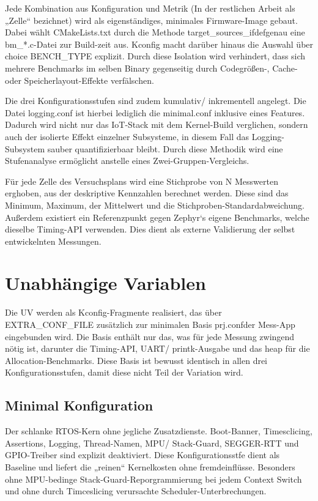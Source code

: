 Jede Kombination aus Konfiguration und Metrik (In der restlichen Arbeit als „Zelle“ bezichnet) wird als eigenständiges, minimales Firmware-Image gebaut. Dabei wählt CMakeLists.txt durch die Methode target\_sources\_ifdefgenau eine bm\_*.c-Datei zur Build-zeit aus. Kconfig macht darüber hinaus die Auswahl über choice BENCH\_TYPE explizit. Durch diese Isolation wird verhindert, dass sich mehrere Benchmarks im selben Binary gegenseitig durch Codegrößen-, Cache- oder Speicherlayout-Effekte verfälschen.

Die drei Konfigurationsstufen sind zudem kumulativ/ inkrementell angelegt. Die Datei logging.conf ist hierbei lediglich die minimal.conf inklusive eines Features. Dadurch wird nicht nur das IoT-Stack mit dem Kernel-Build verglichen, sondern auch der isolierte Effekt einzelner Subsysteme, in diesem Fall das Logging-Subsystem sauber quantifizierbaar bleibt. Durch diese Methodik wird eine Stufenanalyse ermöglicht anstelle eines Zwei-Gruppen-Vergleichs.

Für jede Zelle des Versuchsplans wird eine Stichprobe von N Messwerten erghoben, aus der deskriptive Kennzahlen berechnet werden. Diese sind das Minimum, Maximum, der Mittelwert und die Stichproben-Standardabweichung. Außerdem existiert ein Referenzpunkt gegen Zephyr‘s eigene Benchmarks, welche dieselbe Timing-API verwenden. Dies dient als externe Validierung der selbst entwickelnten Messungen.

\section{Unabhängige Variablen}

Die UV werden als Kconfig-Fragmente realisiert, das über EXTRA\_CONF\_FILE zusätzlich zur minimalen Basis prj.confder Mess-App eingebunden wird. Die Basis enthält nur das, was für jede Messung zwingend nötig ist, darunter die Timing-API, UART/ printk-Ausgabe und das heap für die Allocation-Benchmarks. Diese Basis ist bewusst identisch in allen drei Konfigurationsstufen, damit diese nicht Teil der Variation wird.

\subsection{Minimal Konfiguration}

Der schlanke RTOS-Kern ohne jegliche Zusatzdienste. Boot-Banner, Timesclicing, Assertions, Logging, Thread-Namen, MPU/ Stack-Guard, SEGGER-RTT und GPIO-Treiber sind explizit deaktiviert. Diese Konfigurationsstfe dient als Baseline und liefert die „reinen“ Kernelkosten ohne fremdeinflüsse. Besonders ohne MPU-bedinge Stack-Guard-Reporgrammierung bei jedem Context Switch und ohne durch Timceslicing verursachte Scheduler-Unterbrechungen.

